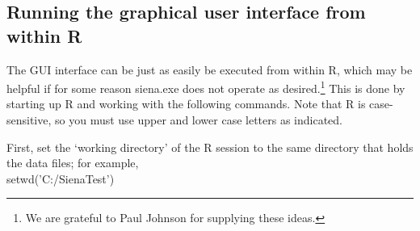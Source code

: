 \documentclass[a4paper,fleqn]{article}
\newcommand{\+}{\, + \,}
\newcommand{\sfn}[1]{\textsf{#1}}
\newcommand{\R}{{\sf R }}
\newcommand{\Rn}{{\sf R}}
\begin{document}
\subsection{Running  the graphical user interface from within \R}
\label{S_guiinR}

The GUI interface can be just as easily be executed from within \Rn,
which may be helpful if for some reason \textsf{siena.exe}
does not operate as desired.\protect\footnote{We are
grateful to Paul Johnson for supplying
these ideas.}
This is done by starting up \R and working with the following commands.
Note that \R is case-sensitive, so you must use upper and lower
case letters as indicated.

First, set the `working directory' of the \R session
to the same directory that holds the data files;
for example,\\
\sfn{setwd('C:/SienaTest')}
\end{document}

